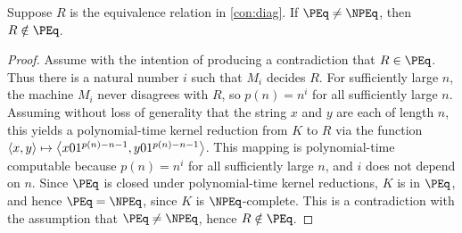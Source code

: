 \begin{lemma}
  Suppose $R$ is the equivalence relation in \autoref{con:diag}.
  If $\PEq \neq \NPEq$, then $R \notin \PEq$.
\end{lemma}
\begin{proof}
  Assume with the intention of producing a contradiction that $R \in \PEq$.
  Thus there is a natural number $i$ such that $M_i$ decides $R$.
  For sufficiently large $n$, the machine $M_i$ never disagrees with $R$, so $p(n) = n^i$ for all sufficiently large $n$.
  Assuming without loss of generality that the string $x$ and $y$ are each of length $n$, this yields a polynomial-time kernel reduction from $K$ to $R$ via the function $\langle x,y\rangle \mapsto \left\langle x 0 1^{p(n) - n - 1}, y 0 1^{p(n) - n - 1}\right\rangle$.
  This mapping is polynomial-time computable because $p(n) = n^i$ for all sufficiently large $n$, and $i$ does not depend on $n$.
  Since $\PEq$ is closed under polynomial-time kernel reductions, $K$ is in $\PEq$, and hence $\PEq = \NPEq$, since $K$ is $\NPEq$-complete.
  This is a contradiction with the assumption that $\PEq \neq \NPEq$, hence $R \notin \PEq$.
\end{proof}

